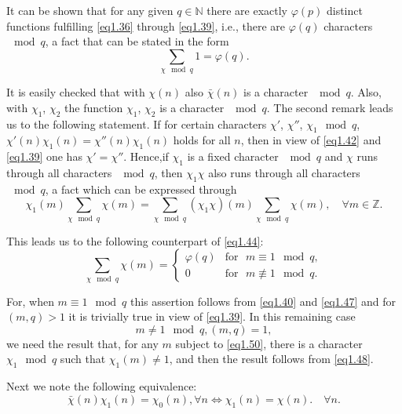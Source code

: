 It can be shown that for any given $q \in \mathbb{N}$ there are exactly
$\varphi(p)$ distinct functions fulfilling \eqref{eq1.36} through
\eqref{eq1.39}, 
i.e., there are $\varphi(q)$ characters $\mod q$, a fact that can be
stated in the form  
\begin{equation*}%
\sum_{\chi\mod q} 1=\varphi (q). \tag{1.47}\label{eq1.47}
\end{equation*}

It is easily checked that with $\chi(n)$ also $\bar{\chi}(n)$ is a character
$\mod q$. Also, with $\chi_1$, $\chi_2$ the function $\chi_1$, $\chi_2$ is a
character $\mod q$. The second remark leads us to the following
statement. If for certain  characters $\chi'$, $\chi''$, $\chi_1 \mod
q$, $\chi' (n) \chi_1(n)= \chi''(n)\chi_{1}(n)$ holds for all $n$, then
in view of \eqref{eq1.42} and \eqref{eq1.39}  one has
$\chi'=\chi''$. Hence,\pageoriginale if $\chi_1$ is a fixed character 
$\mod q$ and $\chi$ runs through all characters $\mod q$, then $\chi_1\chi$
also runs through all characters $\mod q$, a fact which can be expressed
through  
\begin{equation*}%
\chi_1(m) \sum_{\chi  \mod q}\chi(m)= \sum_{\chi  \mod
  q}{(\chi_1\chi)}(m)\sum_ {\chi  \mod q} \chi(m),\quad \forall m \in
\mathbb{Z} .  \tag{1.48}\label{eq1.48}
\end{equation*}

This leads us to the following counterpart of \eqref{eq1.44}:
\begin{equation*}%
\sum_{\chi \mod q}\chi(m) = 
\begin{cases} 
\varphi(q) & \text{for~ } m \equiv 1 \mod q, \\
0 & \text{for~  } m \nequiv 1 \mod q. 
\end{cases}\tag{1.49}\label{eq1.49}
\end{equation*}

For, when $m\equiv 1 \mod q$ this assertion follows from \eqref{eq1.40} and
\eqref{eq1.47} and for $(m,q)>1$ it is trivially true in view of
\eqref{eq1.39}. In this remaining case  
\begin{equation*}%
m \neq 1 \mod q, (m,q)=1, \tag{1.50}\label{eq1.50}
\end{equation*}
we need the result that, for any $m$ subject to \eqref{eq1.50}, there is a
character $\chi_1 \mod q$ such that $\chi_1(m) \neq 1$, and then the result
follows from \eqref{eq1.48}. 
  
Next we note the following equivalence:
\begin{equation*}%
\bar{\chi}(n)\chi_1(n)= \chi_0(n), \forall n \Leftrightarrow
\chi_1(n)= \chi(n).\quad \forall n. \tag{1.51}\label{eq1.51} 
\end{equation*}

